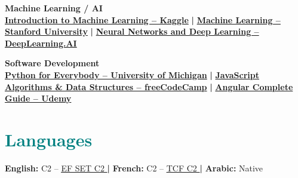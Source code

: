 \documentclass[11pt]{article}
\newcommand{\LanguagesSection}[0]{\section*{\textcolor{teal}{Languages}}}
\begin{document}
\textbf{Machine Learning / AI} \\
\href{https://www.kaggle.com/learn/intro-to-machine-learning}{\textbf{Introduction to Machine Learning – Kaggle}} \textbf{ | }
\href{https://www.coursera.org/learn/machine-learning}{\textbf{Machine Learning – Stanford University}} \textbf{ | }
\href{https://www.coursera.org/learn/neural-networks-deep-learning}{\textbf{Neural Networks and Deep Learning – DeepLearning.AI}}
\vspace{0.2cm}

\textbf{Software Development} \\
\href{https://www.coursera.org/specializations/python}{\textbf{Python for Everybody – University of Michigan}} \textbf{ | }
\href{https://www.freecodecamp.org/learn/javascript-algorithms-and-data-structures/}{\textbf{JavaScript Algorithms \& Data Structures – freeCodeCamp}} \textbf{ | }
\href{https://www.udemy.com/course/angular-complete-guide/}{\textbf{Angular Complete Guide – Udemy}} 

\LanguagesSection
\textbf{English:} C2 – \href{https://cert.efset.org/6YsT6y}{\underline{EF SET C2} \faLink} \textbf{ | }
\textbf{French:} C2 – \href{https://www.france-education-international.fr/test/dalf}{\underline{TCF C2} \faLink} \textbf{ | }
\textbf{Arabic:} Native

\vspace{-0.3cm}
\end{document}
